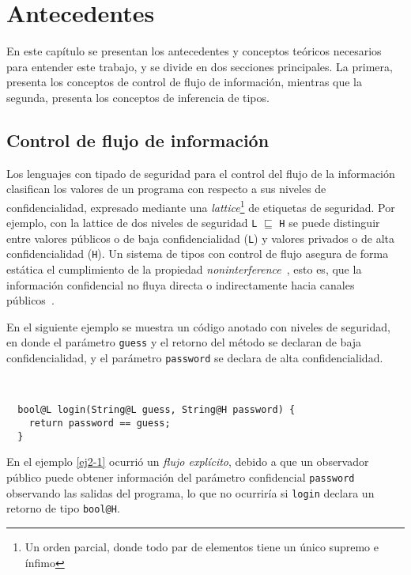\chapter{Antecedentes}
En este capítulo se presentan los antecedentes y conceptos teóricos necesarios para entender este trabajo, y se divide en dos secciones principales. La primera, presenta los conceptos de control de flujo de información, mientras que la segunda, presenta los conceptos de inferencia de tipos.
\section{Control de flujo de información} \label{controlflujo}
Los lenguajes con tipado de seguridad para el control del flujo de la información clasifican los valores de un programa con respecto a sus niveles de confidencialidad, expresado mediante una \emph{lattice}\footnote{Un orden parcial, donde todo par de elementos tiene un único supremo e ínfimo} de etiquetas de seguridad. Por ejemplo, con la lattice de dos niveles de seguridad \texttt{L} $\sqsubseteq$ \texttt{H} se puede distinguir entre valores públicos o de baja confidencialidad (\texttt{L}) y valores privados o de alta confidencialidad (\texttt{H}). Un sistema de tipos con control de flujo asegura de forma estática el cumplimiento de la propiedad \emph{noninterference}~\cite{noninterference}, esto es, que la información confidencial no fluya directa o indirectamente hacia canales públicos~\cite{volpanoAl:S96}.

En el siguiente ejemplo se muestra un código anotado con niveles de seguridad, en donde el parámetro \texttt{guess} y el retorno del método se declaran de baja confidencialidad, y el parámetro \texttt{password} se declara de alta confidencialidad.

\begin{ej} \ \\
  \normalfont
  \label{ej2-1}
\begin{lstlisting}
  bool@L login(String@L guess, String@H password) {
    return password == guess;
  }
\end{lstlisting}
\end{ej}

En el ejemplo \ref{ej2-1} ocurrió un \emph{flujo explícito}, debido a que un observador público puede obtener información del parámetro confidencial \texttt{password} observando las salidas del programa, lo que no ocurriría si \texttt{login} declara un retorno de tipo \texttt{bool@H}.

